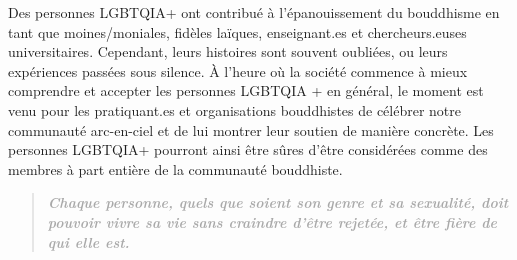 \documentclass[12pt,openany]{book}
\begin{document}
\noindent Des personnes \mbox{LGBTQIA+} ont contribué à l’épanouissement du bouddhisme en tant que moines/moniales, fidèles laïques, enseignant.es et chercheurs.euses universitaires.
Cependant, leurs histoires sont souvent oubliées, ou leurs expériences passées sous silence.
À l’heure où la société commence à mieux comprendre et accepter les personnes LGBTQIA + en général, le moment est venu pour les pratiquant.es et organisations bouddhistes de célébrer notre communauté arc-en-ciel et de lui montrer leur soutien de manière concrète.
Les personnes \mbox{LGBTQIA+} pourront ainsi être sûres d’être considérées comme des membres à part entière de la communauté bouddhiste.

\begingroup
\begin{figure}[h]
    \centering
\end{figure}

\addtolength\leftmargin{-0.2in}
\begin{quote}
\centering
\doublespacing
\textit{\Large \textbf{\textcolor{darkgray}{Chaque personne, quels que soient son genre et sa sexualité, doit pouvoir vivre sa vie sans craindre d’être rejetée, et être fière de qui elle est.}}}
\end{quote}
\endgroup
\end{document}

